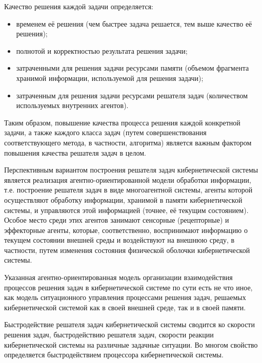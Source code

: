 Качество решения каждой задачи определяется:
\begin{itemize}
    \item{временем её решения (чем быстрее задача решается, тем выше качество её решения);}
    \item{полнотой и корректностью результата решения задачи;}
    \item{затраченными для решения задачи ресурсами памяти (объемом фрагмента хранимой информации, используемой для решения задачи);}
    \item{затраченным для решения задачи ресурсами решателя задач (количеством используемых внутренних агентов).}
\end{itemize}

Таким образом, повышение качества процесса решения каждой конкретной задачи, а также каждого класса задач (путем совершенствования соответствующего метода, в частности, алгоритма) является важным фактором повышения качества решателя задач в целом.

Перспективным вариантом построения решателя задач кибернетической системы является реализация агентно-ориентированной модели обработки информации, т.е. построение решателя задач в виде многоагентной системы, агенты которой осуществляют обработку информации, хранимой в памяти кибернетической системы, и управляются этой информацией (точнее, её текущим состоянием). 
Особое место среди этих агентов занимают сенсорные (рецепторные) и эффекторные агенты, которые, соответственно, воспринимают информацию о текущем состоянии внешней среды и воздействуют на внешнюю среду, в частности, путем изменения состояния физической оболочки кибернетической системы.

Указанная агентно-ориентированная модель организации взаимодействия процессов решения задач в кибернетической системе по сути есть не что иное, как модель ситуационного управления процессами решения задач, решаемых кибернетической системой как в своей внешней среде, так и в своей памяти.

Быстродействие решателя задач кибернетической системы сводится ко скорости решения задач, быстродействию решателя задач, скорости реакции кибернетической системы на различные задачные ситуации.
Во многом свойство определяется быстродействием процессора кибернетической системы.

